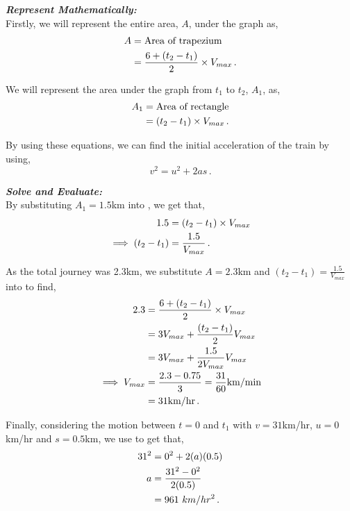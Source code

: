 \begin{subquestions}
\begin{subsubquestions}
\textbf{\textit{Represent Mathematically:}} \\
Firstly, we will represent the entire area, $A$, under the graph as,
\begin{align}
	A & = \text{Area of trapezium} \nonumber \\
	  & = \frac{6 + (t_2-t_1)}{2}\times V_{max} \,. \label{2011:q6:AEqn1}
\end{align}   
	
We will represent the area under the graph from $t_1$ to $t_2$, $A_1$, as,
\begin{align}
	A_1 & = \text{Area of rectangle} \nonumber \\
	& = (t_2-t_1)\times V_{max} \,. \label{2011:q6:AEqn2}
\end{align}  
	
By using these equations, we can find the initial acceleration of the train by using,
\begin{equation}
	v^2 = u^2 + 2as  \label{2011:q6:AEqn3} \,. 
\end{equation} 



\textbf{\textit{Solve and Evaluate:}} \\
By substituting $A_1=1.5$km into , we get that,
\begin{align}
	1.5 & = (t_2-t_1)\times V_{max} \nonumber \\
	\implies (t_2-t_1) & = \frac{1.5}{V_{max}} \,.
\end{align}

As the total journey was 2.3km, we substitute $A=2.3$km and $(t_2-t_1) = \frac{1.5}{V_{max}}$ into  to find,
\begin{align}
	2.3 & = \frac{6 + (t_2-t_1)}{2}\times V_{max} \nonumber \\
		& = 3V_{max} + \frac{(t_2-t_1)}{2}V_{max} \nonumber \\
		& = 3V_{max} + \frac{1.5}{2V_{max}}V_{max} \nonumber \\
		\implies V_{max} & = \frac{2.3-0.75}{3} = \frac{31}{60} \text{km/min} \nonumber \\
		               & = 31\text{km/hr} \,.
\end{align}

Finally, considering the motion between $t=0$ and $t_1$ with $v=31$km/hr, $u=0$km/hr and $s=0.5$km, we use  to get that,
\begin{align}
	31^2 & = 0^2 + 2(a)(0.5) \nonumber \\
	a & = \frac{31^2-0^2}{2(0.5)} \nonumber \\
	  & = 961 ~km/hr^2 \,.
\end{align}


\end{subsubquestions}
\end{subquestions}
